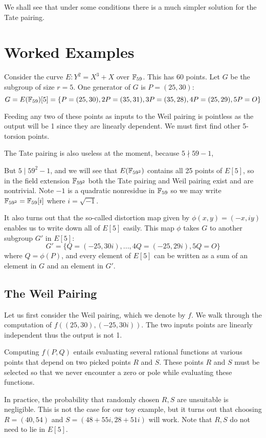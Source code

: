 We shall see that under some conditions there is a much simpler solution
for the Tate pairing.

\section {Worked Examples}

Consider the curve $E : Y^2 = X^3 + X$ over $\mathbb{F}_{59}$.
This has 60 points. Let $G$ be the subgroup of size $r = 5$.
One generator of $G$ is $P = (25, 30)$:
\[ G =
E(\mathbb{F}_{59})[5] =
\{P = (25, 30), 2P = (35, 31), 3P = (35, 28), 4P = (25, 29), 5P = O \} \]

Feeding any two of these points as inputs to the Weil pairing is pointless
as the output will be 1 since they are linearly dependent. We must first
find other 5-torsion points.

The Tate pairing is also useless at the moment, because $5 \nmid 59 - 1$,

But $5 \mid 59^2 - 1$, and we will see that $E(\mathbb{F}_{59^2})$ contains
all 25 points of $E[5]$, so in the field extension $\mathbb{F}_{59^2}$
both the Tate pairing
and Weil pairing exist and are nontrivial.
Note $-1$ is a quadratic nonresidue in $\mathbb{F}_{59}$
so we may write $\mathbb{F}_{59^2} = \mathbb{F}_{59}[i]$ where $i = \sqrt{-1}$.

It also turns out that the so-called distortion map given by
$\phi(x,y) = (-x, i y)$ enables us to write down all of $E[5]$ easily.
This map $\phi$ takes $G$ to another subgroup $G'$ in $E[5]$:
\[ G' =
\{Q = (-25, 30i), ..., 4Q = (-25, 29i), 5Q = O \} \]
where $Q = \phi(P)$,
and every element of $E[5]$ can be written as a sum of an element in $G$
and an element in $G'$.

\subsection {The Weil Pairing}

Let us first consider the Weil pairing, which we denote by $f$.
We walk through the computation of $f((25,30), (-25,30i))$.
The two inputs points are linearly independent thus the output is not 1.

Computing $f(P, Q)$ entails evaluating several rational functions
at various points that depend on two picked points $R$ and $S$.
These points $R$ and $S$ must be selected so that we never encounter a
zero or pole while evaluating these functions.

In practice, the probability that randomly chosen $R, S$ are unsuitable
is negligible. This is not the case for our toy example, but it turns
out that choosing $R = (40,54)$ and $S = (48+55i,28+51i)$
will work. Note that $R, S$ do not need to lie in $E[5]$.

